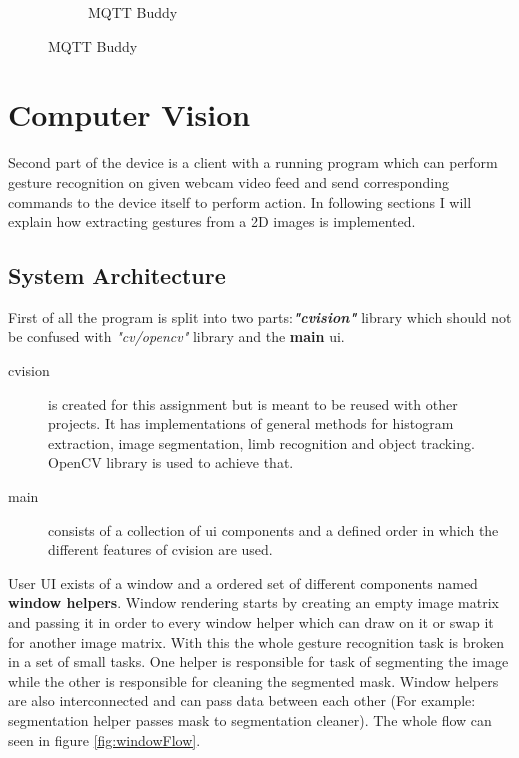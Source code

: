 \documentclass[11pt,a4paper]{article}
\begin{document}
\begin{figure}
\begin{subfigure}[h]{0.3\linewidth}
\caption{MQTT Buddy}
\label{fig:mqttBuddy}
\end{subfigure}%
\end{figure}

\section{Computer Vision}
Second part of the device is a client with a running program which can perform gesture recognition on given webcam video feed and send corresponding commands to the device itself to perform action. In following sections I will explain how extracting gestures from a 2D images is implemented. 

\subsection{System Architecture}
First of all the program is split into two parts:\textbf{\textit{"cvision"}} library which should not be confused with \textit{"cv/opencv"} library and the \textbf{main} ui. 

\begin{description}
\item [cvision] is created for this assignment but is meant to be reused with other projects. It has implementations of general methods for histogram extraction, image segmentation, limb recognition and object tracking. OpenCV library is used to achieve that.
\item [main] consists of a collection of ui components and a defined order in which the different features of cvision are used. 
\end{description}

User UI exists of a window and a ordered set of different components named \textbf{window helpers}. Window rendering starts by creating an empty image matrix and passing it in order to every window helper which can draw on it or swap it for another image matrix. With this the whole gesture recognition task is broken in a set of small tasks. One helper is responsible for task of segmenting the image while the other is responsible for cleaning the segmented mask. Window helpers are also interconnected and can pass data between each other (For example: segmentation helper passes mask to segmentation cleaner). The whole flow can seen in figure \ref{fig:windowFlow}.\bigskip
\end{document}
